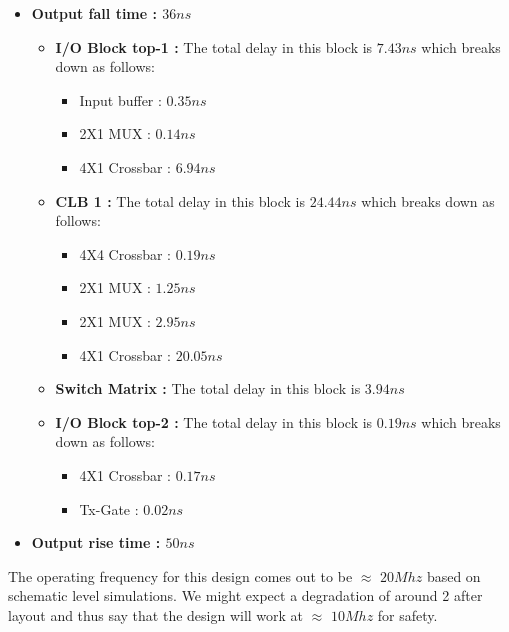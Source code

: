 \begin{itemize}
\item \textbf{Output fall time : $36ns$}
\begin{itemize}
\item \textbf{I/O Block top-1 : } The total delay in this block is $7.43ns$ which breaks down as follows:
\begin{itemize}
\item Input buffer : $0.35ns$
\item 2X1 MUX : $0.14ns$
\item 4X1 Crossbar : $6.94ns$
\end{itemize}
\item \textbf{CLB 1 : } The total delay in this block is $24.44ns$ which breaks down as follows:
\begin{itemize}
\item 4X4 Crossbar : $0.19ns$
\item 2X1 MUX : $1.25ns$
\item 2X1 MUX : $2.95ns$
\item 4X1 Crossbar : $20.05ns$
\end{itemize}
\item \textbf{Switch Matrix : } The total delay in this block is $3.94ns$
\item \textbf{I/O Block top-2 : } The total delay in this block is $0.19ns$ which breaks down as follows:
\begin{itemize}
\item 4X1 Crossbar : $0.17ns$
\item Tx-Gate : $0.02ns$
\end{itemize}
\end{itemize}
\item \textbf{Output rise time : $50ns$}
\end{itemize}

The operating frequency for this design comes out to be $\approx$ $20Mhz$ based on schematic level simulations. We might expect a degradation of around 2 after layout and thus say that the design will work at $\approx$ $10Mhz$ for safety.

